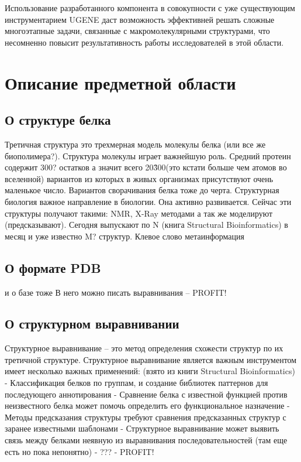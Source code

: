 \documentclass[a4paper, 12pt, titlepage, utf8]{extarticle}
\begin{document}
Использование разработанного компонента в совокупности с уже существующим инструментарием UGENE даст возможность эффективней решать сложные многоэтапные задачи, связанные с макромолекулярными структурами, что несомненно повысит результативность работы исследователей в этой области.

\section{Описание предметной области}	%

\subsection{О структуре белка}
Третичная структура это трехмерная модель молекулы белка (или все же биополимера?). Структура молекулы играет важнейшую роль. Средний протеин содержит 300? остатков а значит всего 20\^300(это кстати больше чем атомов во вселенной) вариантов из которых в живых организмах присутствуют очень маленькое число. Вариантов сворачивания белка тоже до черта. Структурная биология важное направление в биологии. Она активно развивается. Сейчас эти структуры получают такими: NMR, X-Ray методами а так же моделируют (предсказывают). Сегодня выпускают по N (книга Structural Bioinformatics) в месяц и уже известно M? структур.
Клевое слово метаинформация

\subsection{О формате PDB}
и о базе тоже
В него можно писать выравнивания -- PROFIT!

\subsection{О структурном выравнивании}
Структурное выравнивание -- это метод определения схожести структур по их третичной структуре.%
Структурное выравнивание является важным инструментом имеет несколько важных применений:
	(взято из книги Structural Bioinformatics)
	- Классификация белков по группам, и создание библиотек паттернов для последующего аннотирования
	- Сравнение белка с известной функцией против неизвестного белка может помочь определить его функциональное назначение 
	- Методы предсказания структуры требуют сравнения предсказанных структур с заранее известными шаблонами
	- Структурное выравнивание может выявить связь между белками неявную из выравнивания последовательностей (там еще есть но пока непонятно)
	- ???
	- PROFIT!
\end{document}
